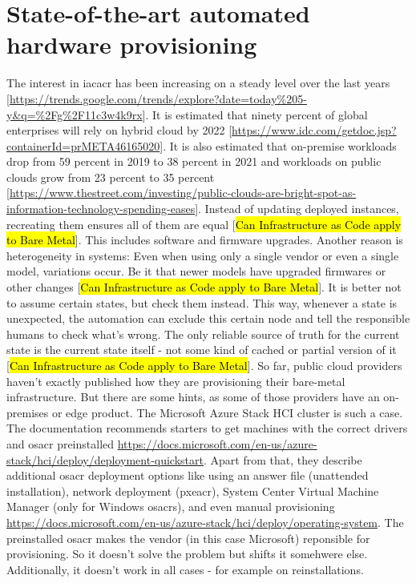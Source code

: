 \section{State-of-the-art automated hardware provisioning} %
The interest in \gls{iacacr} has been increasing on a steady level over the last years [\url{https://trends.google.com/trends/explore?date=today%205-y&q=%2Fg%2F11c3w4k9rx}].
\newline
It is estimated that ninety percent of global enterprises will rely on hybrid cloud by 2022 [\url{https://www.idc.com/getdoc.jsp?containerId=prMETA46165020}].
It is also estimated that on-premise workloads drop from 59 percent in 2019 to 38 percent in 2021 and workloads on public clouds grow from 23 percent to 35 percent [\url{https://www.thestreet.com/investing/public-clouds-are-bright-spot-as-information-technology-spending-eases}].
\newline
Instead of updating deployed instances, recreating them ensures all of them are equal [\hl{Can Infrastructure as Code apply to Bare Metal}]. This includes software and firmware upgrades.
\newline
Another reason is heterogeneity in systems: Even when using only a single vendor or even a single model, variations occur. Be it that newer models have upgraded firmwares or other  changes [\hl{Can Infrastructure as Code apply to Bare Metal}].
\newline
It is better not to assume certain states, but check them instead. This way, whenever a state is unexpected, the automation can exclude this certain node and tell the responsible humans to check what's wrong. The only reliable source of truth for the current state is the current state itself - not some kind of cached or partial version of it [\hl{Can Infrastructure as Code apply to Bare Metal}].
\newline
So far, public cloud providers haven't exactly published how they are provisioning their bare-metal infrastructure.
\newline
But there are some hints, as some of those providers have an on-premises or edge product. The Microsoft Azure Stack HCI cluster is such a case. The documentation recommends starters to get machines with the correct drivers and \gls{osacr} preinstalled \url{https://docs.microsoft.com/en-us/azure-stack/hci/deploy/deployment-quickstart}. Apart from that, they describe additional \gls{osacr} deployment options like using an answer file (unattended installation), network deployment (\gls{pxeacr}), System Center Virtual Machine Manager (only for Windows \gls{osacr}s), and even manual provisioning \url{https://docs.microsoft.com/en-us/azure-stack/hci/deploy/operating-system}. The preinstalled \gls{osacr} makes the vendor (in this case Microsoft) reponsible for provisioning. So it doesn't solve the problem but shifts it somehwere else. Additionally, it doesn't work in all cases - for example on reinstallations.
